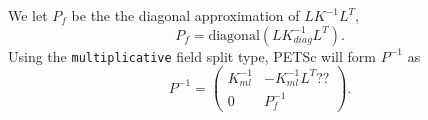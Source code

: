 \documentclass{article}[10pt]
\begin{document}
We let $P_f$ be the the diagonal approximation of $L K^{-1} L^T$,
\begin{equation}
  P_f = \text{diagonal}(L K_\mathit{diag}^{-1} L^T).
\end{equation}
Using the {\tt multiplicative} field split type, PETSc will form
$P^{-1}$ as
\begin{equation}
  P^{-1} = \left( \begin{array}{cc}
    K_\mathit{ml}^{-1} & -K_\mathit{ml}^{-1} L^T ?? \\
    0 & P_f^{-1}
  \end{array} \right).
\end{equation}



\end{document}
